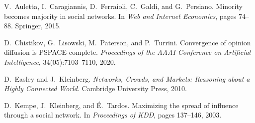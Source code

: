 \documentclass[conference]{IEEEtran}
\begin{document}
\begin{thebibliography}{10}

V.~Auletta, I.~Caragiannis, D.~Ferraioli, C.~Galdi, and G.~Persiano.
\newblock Minority becomes majority in social networks.
\newblock In \emph{Web and Internet Economics}, pages 74--88. Springer, 2015.

D.~Chistikov, G.~Lisowski, M.~Paterson, and P.~Turrini.
\newblock Convergence of opinion diffusion is {PSPACE}-complete.
\newblock \emph{Proceedings of the AAAI Conference on Artificial Intelligence}, 34(05):7103--7110, 2020.

D.~Easley and J.~Kleinberg.
\newblock \emph{Networks, Crowds, and Markets: Reasoning about a Highly Connected World}.
\newblock Cambridge University Press, 2010.

D.~Kempe, J.~Kleinberg, and \'E.~Tardos.
\newblock Maximizing the spread of influence through a social network.
\newblock In \emph{Proceedings of KDD}, pages 137--146, 2003.

\end{thebibliography}
\end{document}
